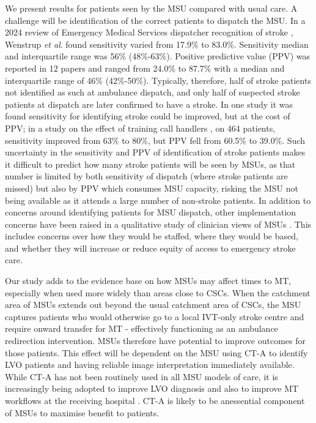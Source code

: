 We present results for patients seen by the MSU compared with usual care. A challenge will be identification of the correct patients to dispatch the MSU. In a 2024 review of Emergency Medical Services dispatcher recognition of stroke \cite{wenstrup_emergency_2024}, Wenstrup \textit{et al}. found sensitivity varied from 17.9\% to 83.0\%. Sensitivity median and interquartile range was 56\% (48\%-63\%). Positive predictive value (PPV) was reported in 12 papers and ranged from 24.0\% to 87.7\% with a median and interquartile range of 46\% (42\%-50\%). Typically, therefore, half of stroke patients not identified as such at ambulance dispatch, and only half of suspected stroke patients at dispatch are later confirmed to have a stroke. In one study it was found sensitivity for identifying stroke could be improved, but at the cost of PPV; in a study on the effect of training call handlers \cite{watkins_training_2013}, on 464 patients, sensitivity improved from 63\% to 80\%, but PPV fell from 60.5\% to 39.0\%. Such uncertainty in the sensitivity and PPV of identification of stroke patients makes it difficult to predict how many stroke patients will be seen by MSUs, as that number is limited by both sensitivity of dispatch (where stroke patients are missed) but also by PPV which consumes MSU capacity, risking the MSU not being available as it attends a large number of non-stroke patients. In addition to concerns around identifying patients for MSU dispatch, other implementation concerns have been raised in a qualitative study of clinician views of MSUs \cite{moseley_practitioner_2024}. This includes concerns over how they would be staffed, where they would be based, and whether they will increase or reduce equity of access to emergency stroke care.

Our study adds to the evidence base on how MSUs may affect times to MT, especially when used more widely than areas close to CSCs. When the catchment area of MSUs extends out beyond the usual catchment area of CSCs, the MSU captures patients who would otherwise go to a local IVT-only stroke centre and require onward transfer for MT - effectively functioning as an ambulance redirection intervention. MSUs therefore have potential to improve outcomes for those patients. This effect will be dependent on the MSU using CT-A to identify LVO patients and having reliable image interpretation immediately available. While CT-A has not been routinely used in all MSU models of care, it is increasingly being adopted to improve LVO diagnosis and also to improve MT workflows at the receiving hospital \cite{czap_mobile_2020}. CT-A is likely to be anessential component of MSUs to maximise benefit to patients. 

